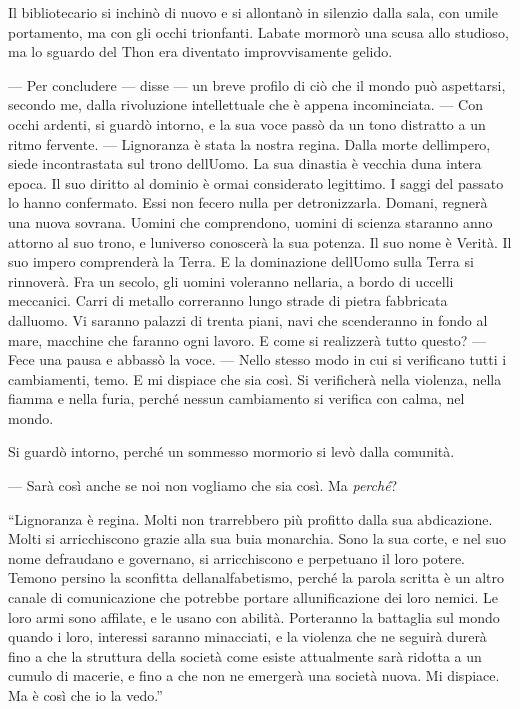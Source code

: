 Il bibliotecario si inchinò di nuovo e si allontanò in silenzio dalla
sala, con umile portamento, ma con gli occhi trionfanti.
L\textquotesingle abate mormorò una scusa allo studioso, ma lo sguardo
del Thon era diventato improvvisamente gelido.

--- Per concludere --- disse --- un breve profilo di ciò che il mondo
può aspettarsi, secondo me, dalla rivoluzione intellettuale che è appena
incominciata. --- Con occhi ardenti, si guardò intorno, e la sua voce
passò da un tono distratto a un ritmo fervente. ---
L\textquotesingle ignoranza è stata la nostra regina. Dalla morte
dell\textquotesingle impero, siede incontrastata sul trono
dell\textquotesingle Uomo. La sua dinastia è vecchia
d\textquotesingle una intera epoca. Il suo diritto al dominio è ormai
considerato legittimo. I saggi del passato lo hanno confermato. Essi non
fecero nulla per detronizzarla. Domani, regnerà una nuova sovrana.
Uomini che comprendono, uomini di scienza staranno anno attorno al suo
trono, e l\textquotesingle universo conoscerà la sua potenza. Il suo
nome è Verità. Il suo impero comprenderà la Terra. E la dominazione
dell\textquotesingle Uomo sulla Terra si rinnoverà. Fra un secolo, gli
uomini voleranno nell\textquotesingle aria, a bordo di uccelli
meccanici. Carri di metallo correranno lungo strade di pietra fabbricata
dall\textquotesingle uomo. Vi saranno palazzi di trenta piani, navi che
scenderanno in fondo al mare, macchine che faranno ogni lavoro. E come
si realizzerà tutto questo? --- Fece una pausa e abbassò la voce. ---
Nello stesso modo in cui si verificano tutti i cambiamenti, temo. E mi
dispiace che sia così. Si verificherà nella violenza, nella fiamma e
nella furia, perché nessun cambiamento si verifica con calma, nel mondo.

Si guardò intorno, perché un sommesso mormorio si levò dalla comunità.

--- Sarà così anche se noi non vogliamo che sia così. Ma \emph{perché}?

``L\textquotesingle ignoranza è regina. Molti non trarrebbero più
profitto dalla sua abdicazione. Molti si arricchiscono grazie alla sua
buia monarchia. Sono la sua corte, e nel suo nome defraudano e
governano, si arricchiscono e perpetuano il loro potere. Temono persino
la sconfitta dell\textquotesingle analfabetismo, perché la parola
scritta è un altro canale di comunicazione che potrebbe portare
all\textquotesingle unificazione dei loro nemici. Le loro armi sono
affilate, e le usano con abilità. Porteranno la battaglia sul mondo
quando i loro, interessi saranno minacciati, e la violenza che ne
seguirà durerà fino a che la struttura della società come esiste
attualmente sarà ridotta a un cumulo di macerie, e fino a che non ne
emergerà una società nuova. Mi dispiace. Ma è così che io la vedo.''

